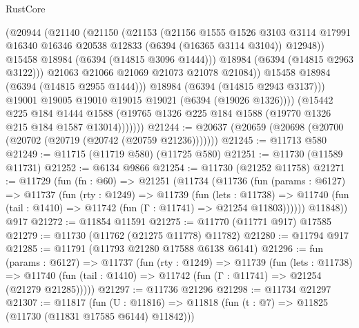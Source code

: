\begin{lexlean}{RustCore}
\begin{coremodule}
                      (@20944
                        (@21140
                          (@21150
                            (@21153
                              (@21156
                                @1555
                                @1526
                                @3103
                                @3114
                                @17991
                                @16340
                                @16346
                                @20538
                                @12833
                                (@6394 (@16365 @3114 @3104))
                                @12948))
                            @15458
                            @18984
                            (@6394 (@14815 @3096 @1444)))
                          @18984
                          (@6394 (@14815 @2963 @3122)))
                        @21063
                        @21066
                        @21069
                        @21073
                        @21078
                        @21084))
                    @15458
                    @18984
                    (@6394 (@14815 @2955 @1444)))
                  @18984
                  (@6394 (@14815 @2943 @3137)))
                @19001
                @19005
                @19010
                @19015
                @19021
                (@6394 (@19026 @1326))))
            (@15442
              @225
              @184
              @1444
              @1588
              (@19765 @1326 @225 @184 @1588 (@19770 @1326 @215 @184 @1587 @13014)))))))
@21244 := @20637 (@20659 (@20698 (@20700 (@20702 (@20719 (@20742 (@20759 @21236)))))))
@21245 := @11713 @580
@21249 := @11715 (@11719 @580) (@11725 @580)
@21251 := @11730 (@11589 @11731)
@21252 := @6134 @9866
@21254 := @11730 (@21252 @11758)
@21271 := @11729
    (fun (fn : @60) =>
    @21251
      (@11734
        (@11736
          (fun (params : @6127) =>
          @11737
            (fun (rty : @1249) =>
            @11739
              (fun (lets : @11738) =>
              @11740 (fun (tail : @1410) => @11742 (fun (Γ : @11741) => @21254 @11803))))))
        @11848))
    @917
@21272 := @11854 @11591
@21275 := @11770 (@11771 @917) @17585
@21279 := @11730 (@11762 (@21275 @11778) @11782)
@21280 := @11794 @917
@21285 := @11791 (@11793 @21280 @17588 @6138 @6141)
@21296 := fun (params : @6127) =>
  @11737
    (fun (rty : @1249) =>
    @11739
      (fun (lets : @11738) =>
      @11740 (fun (tail : @1410) => @11742 (fun (Γ : @11741) => @21254 (@21279 @21285)))))
@21297 := @11736 @21296
@21298 := @11734 @21297
@21307 := @11817
    (fun (U : @11816) => @11818 (fun (t : @7) => @11825 (@11730 (@11831 @17585 @6144) @11842)))

\end{coremodule}
\end{lexlean}
